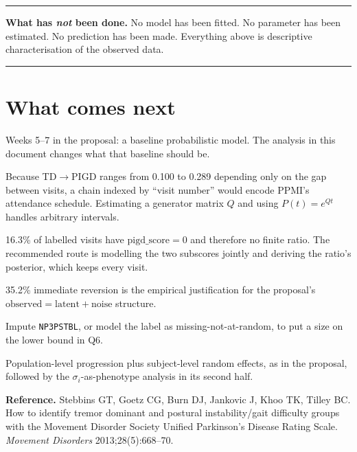 \documentclass[11pt,a4paper]{article}
\newcommand{\code}[1]{\texttt{\small #1}}
\newcommand{\arr}{$\rightarrow$}
\newenvironment{keypoint}
  {\begin{center}\begin{minipage}{0.95\textwidth}%
   \vspace{4pt}\hrule\vspace{7pt}\small}
  {\vspace{7pt}\hrule\vspace{4pt}\end{minipage}\end{center}}
\begin{document}
\begin{keypoint}
\textbf{What has \emph{not} been done.} No model has been fitted. No parameter
has been estimated. No prediction has been made. Everything above is
descriptive characterisation of the observed data.
\end{keypoint}

\section{What comes next}

Weeks 5--7 in the proposal: a baseline probabilistic model. The analysis in
this document changes what that baseline should be.

\begin{description}[leftmargin=1.6cm,style=nextline]
  \item[Continuous-time Markov chain, not discrete] Because TD\arr PIGD ranges
    from 0.100 to 0.289 depending only on the gap between visits, a chain
    indexed by ``visit number'' would encode PPMI's attendance schedule.
    Estimating a generator matrix $Q$ and using $P(t) = e^{Qt}$ handles
    arbitrary intervals.
  \item[Decide the ratio question] 16.3\% of labelled visits have
    $\text{pigd\_score} = 0$ and therefore no finite ratio. The recommended
    route is modelling the two subscores jointly and deriving the ratio's
    posterior, which keeps every visit.
  \item[Address the measurement noise explicitly] 35.2\% immediate reversion is
    the empirical justification for the proposal's
    $\text{observed} = \text{latent} + \text{noise}$ structure.
  \item[Quantify the missingness bias] Impute \code{NP3PSTBL}, or model the
    label as missing-not-at-random, to put a size on the lower bound in Q6.
  \item[Then the hierarchical Bayesian model] Population-level progression plus
    subject-level random effects, as in the proposal, followed by the
    $\sigma_i$-as-phenotype analysis in its second half.
\end{description}

\vspace{1em}
\noindent\textbf{Reference.} Stebbins GT, Goetz CG, Burn DJ, Jankovic J, Khoo TK,
Tilley BC. How to identify tremor dominant and postural instability/gait
difficulty groups with the Movement Disorder Society Unified Parkinson's Disease
Rating Scale. \emph{Movement Disorders} 2013;28(5):668--70.
\end{document}
